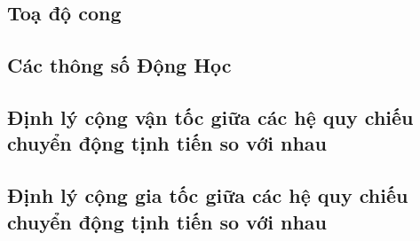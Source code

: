 \subsection{Toạ độ cong}
\subsection{Các thông số Động Học}
\subsection{Định lý cộng vận tốc giữa các hệ quy chiếu chuyển động tịnh tiến so với nhau}
\subsection{Định lý cộng gia tốc giữa các hệ quy chiếu chuyển động tịnh tiến so với nhau}